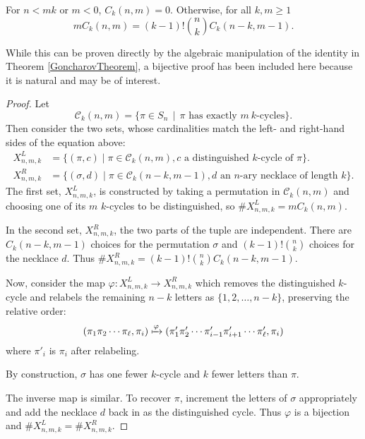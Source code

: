 \begin{lemma}
  \label{cycleRecursion}
  For $n < mk$ or $m < 0$, $C_k(n, m) = 0$. Otherwise,
  for all $k, m \geq 1$ \begin{equation}
    mC_k(n, m) = (k-1)!\binom{n}{k}C_k(n-k, m-1).
  \end{equation}
\end{lemma}
While this can be proven directly by the algebraic manipulation of the
identity in Theorem \ref{GoncharovTheorem}, a bijective proof has been
included here because it is natural and may be of interest.
\begin{proof}
  Let \begin{equation}
  \mathcal C_k(n, m) = \{ \pi \in S_n\,\mid\,\pi \text{ has exactly } m\ k \text{-cycles}\}.
  \end{equation}
  Then consider the two sets, whose cardinalities match the left- and
  right-hand sides of the equation above:
  \begin{align}
    X^{L}_{n,m,k} &= \{ (\pi, c) \mid \pi \in \mathcal C_k(n, m), c \text{ a distinguished } k\text{-cycle of } \pi \}. \\
    X^{R}_{n,m,k} &= \{ (\sigma, d) \mid \pi \in \mathcal C_k(n-k, m-1), d \text{ an } n\text{-ary necklace of length } k\}.
  \end{align}
  The first set, $X^{L}_{n,m,k}$, is constructed by taking a permutation in
  $\mathcal C_k(n,m)$ and choosing one of its $m$ $k$-cycles to be distinguished, so
  $\#X^{L}_{n,m,k} = mC_k(n,m)$.

  In the second set, $X^{R}_{n,m,k}$, the two parts of the tuple are independent.
  There are $C_k(n-k, m-1)$ choices for the permutation $\sigma$ and $(k-1)!\binom{n}{k}$
  choices for the necklace $d$.
  Thus $\#X^{R}_{n,m,k} = (k-1)!\binom{n}{k}C_k(n-k, m-1)$.

  Now, consider the map $\varphi \colon X^{L}_{n,m,k} \rightarrow X^{R}_{n,m,k}$
  which removes the distinguished $k$-cycle and relabels the remaining $n - k$
  letters as $\{1, 2, \dots, n - k\}$, preserving the relative order:
  \begin{equation}
    (\pi_1\pi_2 \cdots \pi_\ell, \pi_i) \xmapsto{\varphi} (\pi'_1\pi'_2 \cdots \pi'_{i-1}\pi'_{i+1} \cdots \pi'_\ell, \pi_i)
  \end{equation} where $\pi'_i$ is $\pi_i$ after relabeling.

  By construction, $\sigma$ has one fewer $k$-cycle and $k$ fewer letters
  than $\pi$.

  The inverse map is similar. To recover $\pi$, increment the letters of $\sigma$ appropriately
  and add the necklace $d$ back in as the distinguished cycle.
  Thus $\varphi$ is a bijection and $\#X^{L}_{n,m,k} = \#X^{R}_{n,m,k}$.
\end{proof}
